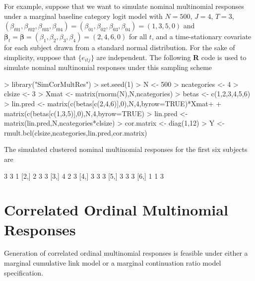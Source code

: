 \documentclass{article}
\begin{document}
\indent For example, suppose that we want to simulate nominal multinomial responses under a marginal baseline category logit model with $N=500$, $J=4$, $T=3$, $(\beta_{t01},\beta_{t02},\beta_{t03},\beta_{t04})=(\beta_{01},\beta_{02},\beta_{03},\beta_{04})=(1,3,5,0)$ and $\boldsymbol \beta_t=\boldsymbol \beta=(\beta_{1},\beta_{2},\beta_{3},\beta_{4})=(2,4,6,0)$ for all $t$, and a time-stationary covariate for each subject drawn from a standard normal distribution. For the sake of simplicity, suppose that $\{e_{itj}\}$ are independent. The following \textbf{R} code is used to simulate nominal multinomial responses under this sampling scheme
\begin{Schunk}
\begin{Sinput}
> library("SimCorMultRes")
> set.seed(1)
> N <- 500
> ncategories <- 4
> clsize <- 3
> Xmat <- matrix(rnorm(N),N,ncategories)
> betas <- c(1,2,3,4,5,6)
> lin.pred <- matrix(c(betas[c(2,4,6)],0),N,4,byrow=TRUE)*Xmat+
+            matrix(c(betas[c(1,3,5)],0),N,4,byrow=TRUE)
> lin.pred <- matrix(lin.pred,N,ncategories*clsize)
> cor.matrix <- diag(1,12)
> Y <- rmult.bcl(clsize,ncategories,lin.pred,cor.matrix)
\end{Sinput}
\end{Schunk}
The simulated clustered nominal multinomial responses for the first six subjects are
\begin{Schunk}
\begin{Soutput}
     [,1] [,2] [,3]
[1,]    3    3    1
[2,]    2    3    3
[3,]    4    2    3
[4,]    3    3    3
[5,]    3    3    3
[6,]    1    1    3
\end{Soutput}
\end{Schunk}
\section{Correlated Ordinal Multinomial Responses}
Generation of correlated ordinal multinomial responses is feasible under either a marginal cumulative link model or a marginal continuation ratio model specification.
\end{document}
